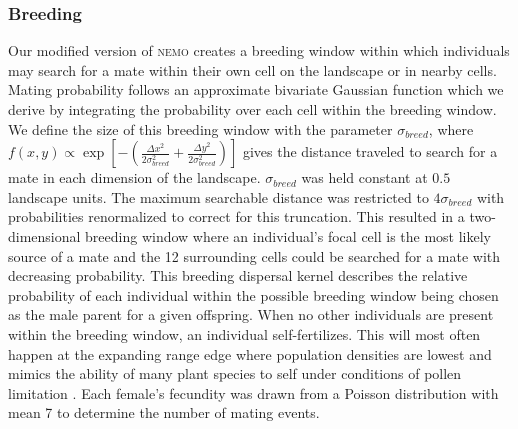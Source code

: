 \subsubsection*{Breeding}
Our modified version of \textsc{nemo} creates a breeding window within which individuals may search for a mate within their own cell on the landscape or in nearby cells. Mating probability follows an approximate bivariate Gaussian function which we derive by integrating the probability over each cell within the breeding window. We define the size of this breeding window with the parameter $\sigma_{breed}$, where $f(x,y) \propto \exp{[-(\frac{\Delta x^2}{2\sigma_{breed}^2}+\frac{\Delta y^2}{2\sigma_{breed}^2})]}$ gives the distance traveled to search for a mate in each dimension of the landscape. $\sigma_{breed}$ was held constant at $0.5$ landscape units. The maximum searchable distance was restricted to $4\sigma_{breed}$ with probabilities renormalized to correct for this truncation. This resulted in a two-dimensional breeding window where an individual's focal cell is the most likely source of a mate and the 12 surrounding cells could be searched for a mate with decreasing probability. This breeding dispersal kernel describes the relative probability of each individual within the possible breeding window being chosen as the male parent for a given offspring. When no other individuals are present within the breeding window, an individual self-fertilizes. This will most often happen at the expanding range edge where population densities are lowest and mimics the ability of many plant species to self under conditions of pollen limitation \citep{Hargreaves:2014}. Each female's fecundity was drawn from a Poisson distribution with mean 7 to determine the number of mating events. 

